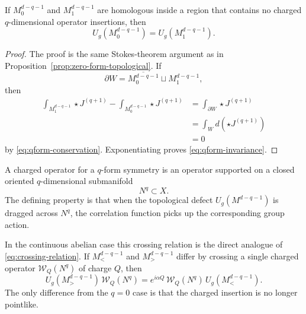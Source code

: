 \begin{proposition}\label{prop:qform-topological}
If $M_0^{d-q-1}$ and $M_1^{d-q-1}$ are homologous inside a region that contains no charged $q$-dimensional operator insertions, then
\begin{equation}\label{eq:qform-invariance}
U_g(M_0^{d-q-1})=U_g(M_1^{d-q-1}).
\end{equation}
\end{proposition}

\begin{proof}
The proof is the same Stokes-theorem argument as in Proposition~\ref{prop:zero-form-topological}. If
\begin{equation*}
\partial W=\overline{M_0^{d-q-1}}\sqcup M_1^{d-q-1},
\end{equation*}
then
\begin{align*}
\int_{M_1^{d-q-1}}\star J^{(q+1)}-\int_{M_0^{d-q-1}}\star J^{(q+1)}
&=
\int_{\partial W}\star J^{(q+1)} \\
&=
\int_W d(\star J^{(q+1)}) \\
&= 0
\end{align*}
by \eqref{eq:qform-conservation}. Exponentiating proves \eqref{eq:qform-invariance}.
\end{proof}

\begin{definition}\label{def:qdim-operator}
A charged operator for a $q$-form symmetry is an operator supported on a closed oriented $q$-dimensional submanifold
\begin{equation*}
N^q\subset X.
\end{equation*}
The defining property is that when the topological defect $U_g(M^{d-q-1})$ is dragged across $N^q$, the correlation function picks up the corresponding group action.
\end{definition}

\noindent In the continuous abelian case this crossing relation is the direct analogue of \eqref{eq:crossing-relation}. If $M_{<}^{d-q-1}$ and $M_{>}^{d-q-1}$ differ by crossing a single charged operator $\mathcal W_Q(N^q)$ of charge $Q$, then
\begin{equation}\label{eq:qform-crossing}
U_g(M_{>}^{d-q-1})\,\mathcal W_Q(N^q)
=
e^{i\alpha Q}\,\mathcal W_Q(N^q)\,U_g(M_{<}^{d-q-1}).
\end{equation}
The only difference from the $q=0$ case is that the charged insertion is no longer pointlike.

